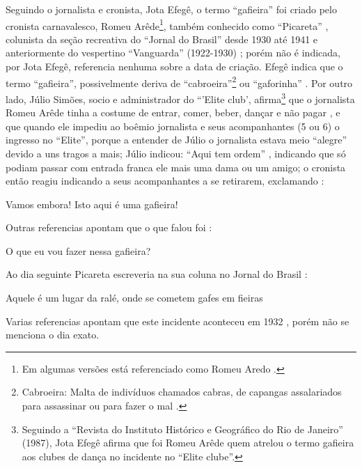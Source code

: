 Seguindo o jornalista e cronista, Jota Efegê, %
o termo ``gafieira'' foi criado pelo cronista carnavalesco, 
Romeu Arêde\footnote{Em algumas versões está  referenciado como Romeu Aredo \cite[pp. 188]{raca1999}.}, 
também conhecido como ``Picareta'' \cite[pp. 29]{instituto1987revista}\cite[pp. 3 - cad. 3]{juliosimoes} 
\cite[pp. 21]{efege1974maxixe} \cite[pp. 78]{coutinho2006cronistas}, 
colunista da seção recreativa do ``Jornal do Brasil'' desde 1930 até 1941
e anteriormente do vespertino ``Vanguarda'' (1922-1930) \cite[pp. 58-59]{efege1982figuras} 
\cite[pp. 6 - cad. B]{entrevistajuliojournalbrasil1};
porém não é indicada, por Jota Efegê, referencia nenhuma sobre a data de criação.
Efegê indica que o termo ``gafieira'', possivelmente deriva de 
``cabroeira''\footnote{Cabroeira: Malta de indivíduos chamados cabras, 
de capangas assalariados para assassinar ou para fazer o mal \cite{diciocabroeira}.} 
ou ``gaforinha'' \cite[pp. 3 - cad. 3]{juliosimoes}.
Por outro lado, Júlio Simões, socio e administrador do ``'Elite club', 
afirma\footnote{Seguindo a ``Revista do Instituto Histórico e Geográfico do Rio de Janeiro'' (1987),
Jota Efegê afirma que foi Romeu Arêde quem atrelou o termo gafieira aos clubes de dança no incidente no ``Elite clube''.} 
que o jornalista Romeu Arêde tinha a costume de entrar, 
comer, beber, dançar e não pagar \cite[pp.13 ]{respeitojournalbrasil1},
e que quando ele impediu ao boêmio jornalista e seus acompanhantes (5 ou 6) o ingresso no ``Elite'', 
porque a entender de Júlio o jornalista estava meio ``alegre'' devido a uns tragos a mais;
 Júlio indicou: ``Aqui tem ordem'' 
\cite[pp.13 ]{respeitojournalbrasil1} \cite[pp. 6]{gafieiraaredeout2} \cite[pp. 3 - Encontro]{gafieiraaredeout1},
indicando que só podiam passar com entrada franca ele mais uma dama ou um amigo;
o cronista então reagiu indicando a seus acompanhantes a se retirarem, 
exclamando \cite[pp. 29]{instituto1987revista} \cite[pp. 6 - Tribuna Bis]{gafieiraaredeout3}: 
\begin{citando}
Vamos embora! Isto aqui é uma gafieira!
\end{citando}
Outras referencias apontam que o que falou foi \cite[pp. 6]{gafieiraaredeout2} \cite[pp. 3 - Encontro]{gafieiraaredeout1}:
\begin{citando}
O que eu vou fazer nessa gafieira?
\end{citando}
Ao dia seguinte Picareta escreveria na sua coluna no Jornal do Brasil \cite[pp. 188]{raca1999}:
\begin{citando}
Aquele é um lugar da ralé, onde se cometem gafes em fieiras
\end{citando}
Varias referencias apontam que este incidente aconteceu em 1932 \cite[pp. 3 - Encontro]{gafieiraaredeout1} \cite[pp. 188]{raca1999}, 
porém não se menciona o dia exato. 




